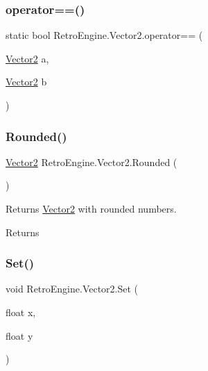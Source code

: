 \mbox{\label{struct_retro_engine_1_1_vector2_a0cd3f9bbe808dd1bf7cdf9dd198016d7}} 
\subsubsection{\texorpdfstring{operator==()}{operator==()}}
{\footnotesize\ttfamily static bool Retro\+Engine.\+Vector2.\+operator== (\begin{DoxyParamCaption}\item[{\mbox{\hyperlink{struct_retro_engine_1_1_vector2}{Vector2}}}]{a,  }\item[{\mbox{\hyperlink{struct_retro_engine_1_1_vector2}{Vector2}}}]{b }\end{DoxyParamCaption})\hspace{0.3cm}{\ttfamily [static]}}

\mbox{\label{struct_retro_engine_1_1_vector2_a24bb0d6eaf8c03180705999395aaeb10}} 
\subsubsection{\texorpdfstring{Rounded()}{Rounded()}}
{\footnotesize\ttfamily \mbox{\hyperlink{struct_retro_engine_1_1_vector2}{Vector2}} Retro\+Engine.\+Vector2.\+Rounded (\begin{DoxyParamCaption}{ }\end{DoxyParamCaption})}



Returns \mbox{\hyperlink{struct_retro_engine_1_1_vector2}{Vector2}} with rounded numbers. 

\begin{DoxyReturn}{Returns}

\end{DoxyReturn}
\mbox{\label{struct_retro_engine_1_1_vector2_a9ab856cd684a41eb26161eacdfcc13a1}} 
\subsubsection{\texorpdfstring{Set()}{Set()}}
{\footnotesize\ttfamily void Retro\+Engine.\+Vector2.\+Set (\begin{DoxyParamCaption}\item[{float}]{x,  }\item[{float}]{y }\end{DoxyParamCaption})}



